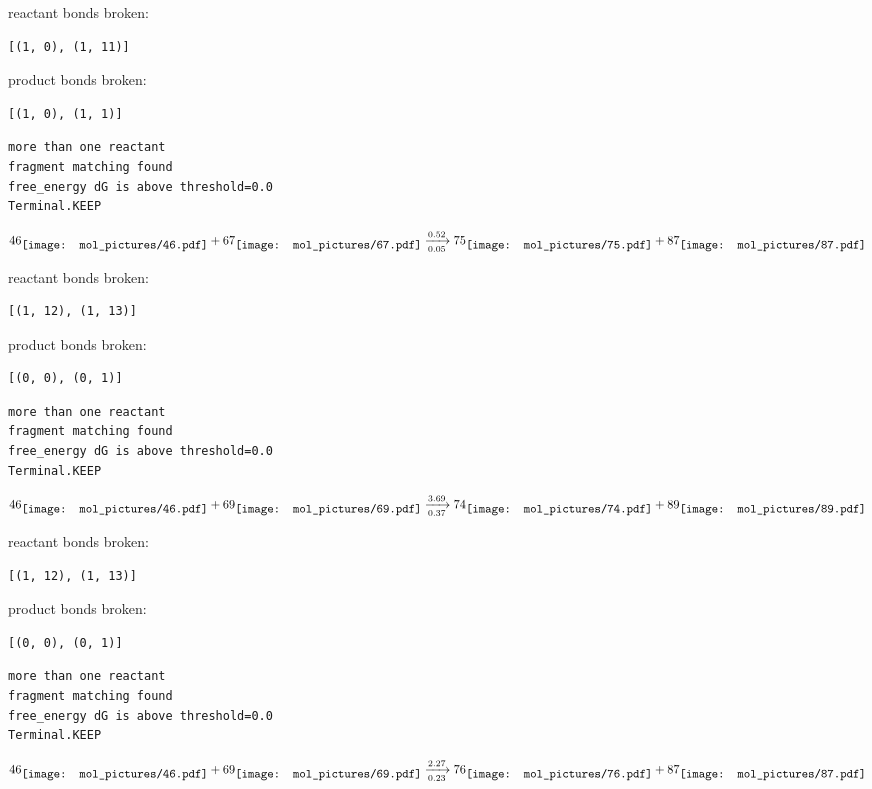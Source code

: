 \documentclass{article}
\begin{document}
reactant bonds broken:\begin{verbatim}
[(1, 0), (1, 11)]
\end{verbatim}
product bonds broken:\begin{verbatim}
[(1, 0), (1, 1)]
\end{verbatim}




\vspace{1cm}
\begin{verbatim}
more than one reactant
fragment matching found
free_energy dG is above threshold=0.0
Terminal.KEEP
\end{verbatim}
$$
46
\raisebox{-.5\height}{\texttt{[image: mol\_pictures/46.pdf]}}
+
67
\raisebox{-.5\height}{\texttt{[image: mol\_pictures/67.pdf]}}
\xrightarrow[0.05]{0.52}
75
\raisebox{-.5\height}{\texttt{[image: mol\_pictures/75.pdf]}}
+
87
\raisebox{-.5\height}{\texttt{[image: mol\_pictures/87.pdf]}}
$$


reactant bonds broken:\begin{verbatim}
[(1, 12), (1, 13)]
\end{verbatim}
product bonds broken:\begin{verbatim}
[(0, 0), (0, 1)]
\end{verbatim}




\vspace{1cm}
\begin{verbatim}
more than one reactant
fragment matching found
free_energy dG is above threshold=0.0
Terminal.KEEP
\end{verbatim}
$$
46
\raisebox{-.5\height}{\texttt{[image: mol\_pictures/46.pdf]}}
+
69
\raisebox{-.5\height}{\texttt{[image: mol\_pictures/69.pdf]}}
\xrightarrow[0.37]{3.69}
74
\raisebox{-.5\height}{\texttt{[image: mol\_pictures/74.pdf]}}
+
89
\raisebox{-.5\height}{\texttt{[image: mol\_pictures/89.pdf]}}
$$


reactant bonds broken:\begin{verbatim}
[(1, 12), (1, 13)]
\end{verbatim}
product bonds broken:\begin{verbatim}
[(0, 0), (0, 1)]
\end{verbatim}




\vspace{1cm}
\begin{verbatim}
more than one reactant
fragment matching found
free_energy dG is above threshold=0.0
Terminal.KEEP
\end{verbatim}
$$
46
\raisebox{-.5\height}{\texttt{[image: mol\_pictures/46.pdf]}}
+
69
\raisebox{-.5\height}{\texttt{[image: mol\_pictures/69.pdf]}}
\xrightarrow[0.23]{2.27}
76
\raisebox{-.5\height}{\texttt{[image: mol\_pictures/76.pdf]}}
+
87
\raisebox{-.5\height}{\texttt{[image: mol\_pictures/87.pdf]}}
$$
\end{document}
